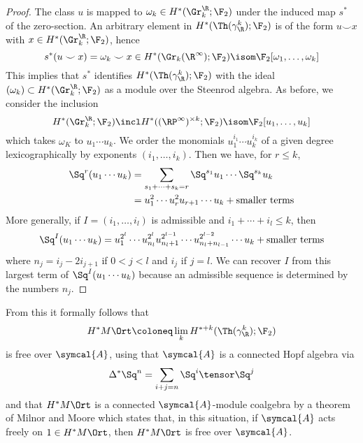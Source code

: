 \begin{proof}
	The class $u$ is mapped to $\omega_k \in H^*(\Gr_k^\R; \F_2)$ under the induced map $s^*$ of the zero-section.
	An arbitrary element in $H^*(\Th(\gamma_\R^k); \F_2)$ is of the form $u \smile x$ with $x \in H^*(\Gr_k^\R; \F_2)$, hence
	\begin{equation*}
		s^*(u \smile x) = \omega_k \smile x \in H^*(\Gr_k(\R^\infty); \F_2) \isom \F_2[\omega_1, \ldots, \omega_k]
	\end{equation*}
	This implies that $s^*$ identifies $H^*(\Th(\gamma_\R^k); \F_2)$ with the ideal $(\omega_k) \subset H^*(\Gr_k^\R; \F_2)$ as a module over the Steenrod algebra.
	As before, we consider the inclusion
	\begin{equation*}
		H^*(\Gr_k^\R; \F_2) \incl H^*((\RP^\infty)^{\times k}; \F_2) \isom \F_2[u_1, \ldots, u_k]
	\end{equation*}
	which takes $\omega_K$ to $u_1 \cdots u_k$.
	We order the monomials $u_1^{i_1} \cdots u_k^{i_k}$ of a given degree lexicographically by exponents $(i_1, \ldots, i_k)$.
	Then we have, for $r \leq k$,
	\begin{align*}
		\Sq^r(u_1 \cdots u_k) &= \sum_{s_1 + \cdots + s_k = r} \Sq^{s_1} u_1 \cdots \Sq^{s_k} u_k \\
							  &= u_1^2 \cdots u_r^2 u_{r + 1} \cdots u_k + \text{smaller terms}
	\end{align*}
	More generally, if $I = (i_1, \ldots, i_l)$ is admissible and $i_1 + \cdots + i_l \leq k$, then
	\begin{equation*}
		\Sq^I(u_1 \cdots u_k) = u_1^{2^l} \cdots u_{n_l}^{2^l} u_{n_l + 1}^{2^{l - 1}} \cdots u_{n_l + n_{l - 1}}^{2^{l - 2}} \cdots u_k + \text{smaller terms}
	\end{equation*}
	where $n_j = i_j - 2i_{j + 1}$ if $0 < j < l$ and $i_j$ if $j = l$.
	We can recover $I$ from this largest term of $\Sq^I(u_1 \cdots u_k)$ because an admissible sequence is determined by the numbers $n_j$.
\end{proof}
\begin{remark}
	From this it formally follows that
	\begin{equation*}
		H^* M\Ort \coloneq \lim_k H^{* + k}(\Th(\gamma_\R^k); \F_2)
	\end{equation*}
	is free over $\symcal{A}$, using that $\symcal{A}$ is a connected Hopf algebra via
	\begin{equation*}
		\Delta^* \Sq^n = \sum_{i + j = n} \Sq^i \tensor \Sq^j
	\end{equation*}
	and that $H^* M \Ort$ is a connected $\symcal{A}$-module coalgebra by a theorem of Milnor and Moore which states that, in this situation, if $\symcal{A}$ acts freely on $1 \in H^* M\Ort$, then $H^* M\Ort$ is free over $\symcal{A}$.
\end{remark}
